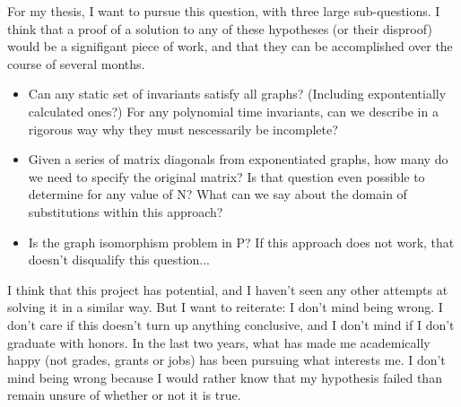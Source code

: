 \documentclass[a4paper,12pt]{article}
\begin{document}
For my thesis, I want to pursue this question, with three large sub-questions.  I think that a proof of a solution to any of these
hypotheses (or their disproof) would be a signifigant piece of work, and that they can be accomplished over the course of several months.
\begin{itemize}
\item Can any static set of invariants satisfy all graphs? (Including expontentially calculated ones?) For any polynomial time
 invariants, can we describe in a rigorous way why they must nescessarily be incomplete?
\item Given a series of matrix diagonals from exponentiated graphs, how many do we need to specify the original matrix?
  Is that question even possible to determine for any value of N? What can we say about the domain of substitutions within this approach?
\item Is the graph isomorphism problem in P? If this approach does not work, that doesn't disqualify this question...
\end{itemize}

I think that this project has potential, and I haven't seen any other attempts at solving it in a similar way. But I want to reiterate: 
I don't mind being wrong.  I don't care if this doesn't turn up anything conclusive, and I don't mind if I don't graduate with honors.
In the last two years, what has made me academically happy (not grades, grants or jobs) has been pursuing what interests me.
I don't mind being wrong because I would rather know that my hypothesis failed than remain unsure of whether or not it is true. 
\end{document}
